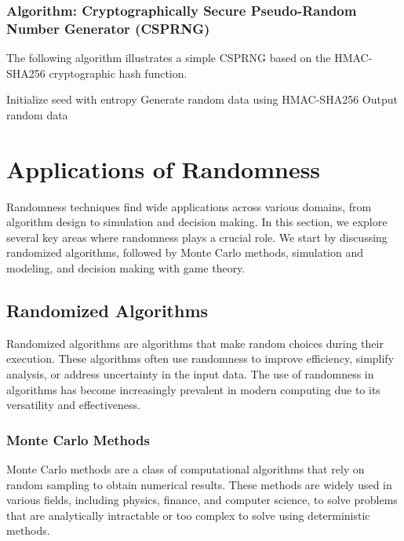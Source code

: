 \documentclass[12pt]{book} %
\begin{document}
\subsubsection{Algorithm: Cryptographically Secure Pseudo-Random Number Generator (CSPRNG)}

The following algorithm illustrates a simple CSPRNG based on the HMAC-SHA256 cryptographic hash function.
\FloatBarrier
\begin{algorithm}
\caption{Cryptographically Secure Pseudo-Random Number Generator (CSPRNG)}
\begin{algorithmic}
\State Initialize seed with entropy
    \State Generate random data using HMAC-SHA256
    \State Output random data
\EndWhile
\end{algorithmic}
\end{algorithm}
\FloatBarrier

\section{Applications of Randomness}

Randomness techniques find wide applications across various domains, from algorithm design to simulation and decision making. In this section, we explore several key areas where randomness plays a crucial role. We start by discussing randomized algorithms, followed by Monte Carlo methods, simulation and modeling, and decision making with game theory.

\subsection{Randomized Algorithms}

Randomized algorithms are algorithms that make random choices during their execution. These algorithms often use randomness to improve efficiency, simplify analysis, or address uncertainty in the input data. The use of randomness in algorithms has become increasingly prevalent in modern computing due to its versatility and effectiveness.

\subsubsection{Monte Carlo Methods}

Monte Carlo methods are a class of computational algorithms that rely on random sampling to obtain numerical results. These methods are widely used in various fields, including physics, finance, and computer science, to solve problems that are analytically intractable or too complex to solve using deterministic methods.
\end{document}
